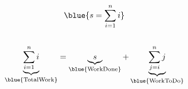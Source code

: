 
\begin{frame}
  \[
    \blue{s = \sum_{i=1}^{n} i}
  \]
  
  \begin{columns}
      
  \end{columns}

  \pause
  \vspace{0.30cm}
  \[
    \underbrace{\sum_{i=1}^{n} i}_{\blue{\text{TotalWork}}} = \underbrace{s}_{\blue{\text{WorkDone}}} +
    \underbrace{\sum_{j = i}^{n} j}_{\blue{\text{WorkToDo}}}
  \]
\end{frame}
